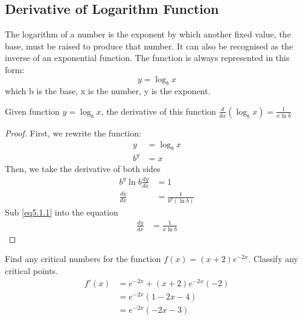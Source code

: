 \subsection{Derivative of Logarithm Function}
\begin{definition}
    The logarithm of a number is the exponent by which another fixed value, the base, must be raised to produce that number. 
    It can also be recognised as the inverse of an exponential function. 
    The function is always represented in this form:
    \[
        y = \log_{b}x
    \]
    which b is the base, x is the number, y is the exponent. 
\end{definition}

\begin{proposition}
    Given function $y = \log_b x$, the derivative of this function $\frac{d}{dx} \left(\log_b x\right) = \frac{1}{x\ln b}$
    \begin{proof}
        First, we rewrite the function:
        \begin{align}
            y &= \log_{b} x \nonumber\\
            b^y &= x \label{eq5.1.1}
        \end{align}
        Then, we take the derivative of both sides
        \begin{align*}
            b^y \ln b \frac{dy}{dx} &= 1 \\
            \frac{dy}{dx} &= \frac{1}{b^y (\ln b)} 
        \end{align*}
        Sub \ref{eq5.1.1} into the equation
        \begin{align*}
            \frac{dy}{dx} &= \frac{1}{x\ln b}
        \end{align*}
    \end{proof}
\end{proposition}

\begin{example}
    Find any critical numbers for the function $f(x) = (x + 2)e^{-2x}$.
    Classify any critical points. 
    \begin{align*}
        f'(x) &= e^{-2x} + (x + 2)e^{-2x}(-2) \\
        &= e^{-2x}\left(1 - 2x - 4\right) \\
        &= e^{-2x}\left(-2x - 3\right)
    \end{align*}
\end{example}
